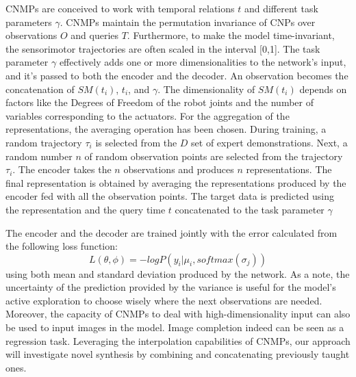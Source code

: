 CNMPs are conceived to work with temporal relations $t$ and different task parameters $\gamma$. CNMPs maintain the permutation invariance of CNPs over observations $O$ and queries $T$. Furthermore, to make the model time-invariant, the sensorimotor trajectories are often scaled in the interval [0,1]. 
The task parameter $\gamma$ effectively adds one or more dimensionalities to the network's input, and it's passed to both the encoder and the decoder. An observation becomes the concatenation of $SM(t_i)$, $t_i$, and $\gamma$. The dimensionality of $SM(t_i)$ depends on factors like the Degrees of Freedom of the robot joints and the number of variables corresponding to the actuators. 
For the aggregation of the representations, the averaging operation has been chosen.
During training, a random trajectory $\tau_i$ is selected from the $D$ set of expert demonstrations. Next, a random number $n$ of random observation points are selected from the trajectory $\tau_i$. The encoder takes the $n$ observations and produces $n$ representations. The final representation is obtained by averaging the representations produced by the encoder fed with all the observation points. 
The target data is predicted using the representation and the query time $t$ concatenated to the task parameter $\gamma$

The encoder and the decoder are trained jointly with the error calculated from the following loss function:
\begin{equation}
    L(\theta, \phi)= -logP(y_i|\mu_i, softmax(\sigma_j))
\end{equation}
using both mean and standard deviation produced by the network.
As a note, the uncertainty of the prediction provided by the variance is useful for the model's active exploration to choose wisely where the next observations are needed.
Moreover, the capacity of CNMPs to deal with high-dimensionality input can also be used to input images in the model. Image completion indeed can be seen as a regression task.
Leveraging the interpolation capabilities of CNMPs, our approach will investigate novel synthesis by combining and concatenating previously taught ones.